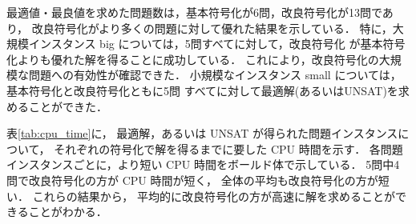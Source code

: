 最適値・最良値を求めた問題数は，基本符号化が6問，改良符号化が13問であり，
改良符号化がより多くの問題に対して優れた結果を示している．
特に，大規模インスタンス big については，5問すべてに対して，改良符号化
が基本符号化よりも優れた解を得ることに成功している．
これにより，改良符号化の大規模な問題への有効性が確認できた．
%
小規模なインスタンス small については，基本符号化と改良符号化ともに5問
すべてに対して最適解(あるいは\textsf{UNSAT})を求めることができた．

表\ref{tab:cpu_time}に，
最適解，あるいは \textsf{UNSAT} が得られた問題インスタンスについて，
それぞれの符号化で解を得るまでに要した CPU 時間を示す．
各問題インスタンスごとに，より短い CPU 時間をボールド体で示している．
5問中4問で改良符号化の方が CPU 時間が短く，
全体の平均も改良符号化の方が短い．
これらの結果から，
平均的に改良符号化の方が高速に解を求めることができることがわかる．




